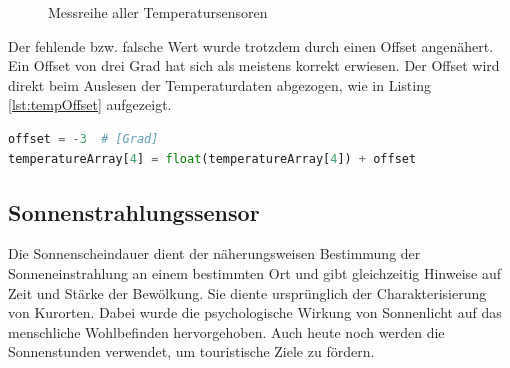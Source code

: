 \begin{figure}[htb!]
	\centering
	\caption{Messreihe aller Temperatursensoren}
	\label{img:tempSensoren}
\end{figure}

\noindent
Der fehlende bzw. falsche Wert wurde trotzdem durch einen Offset angenähert. Ein Offset von drei Grad hat sich als meistens korrekt erwiesen. Der Offset wird direkt beim Auslesen der Temperaturdaten abgezogen, wie in Listing \ref{lst:tempOffset} aufgezeigt.

\vspace{3mm}
\begin{lstlisting}[label=lst:tempOffset,caption=Offset des defekten Temperatursensors, language=Python, style=py]
offset = -3  # [Grad]
temperatureArray[4] = float(temperatureArray[4]) + offset
\end{lstlisting}


\subsection{Sonnenstrahlungssensor}
Die Sonnenscheindauer dient der näherungsweisen Bestimmung der Sonneneinstrahlung an einem bestimmten Ort und gibt gleichzeitig Hinweise auf Zeit und Stärke der Bewölkung. Sie diente ursprünglich der Charakterisierung von Kurorten. Dabei wurde die psychologische Wirkung von Sonnenlicht auf das menschliche Wohlbefinden hervorgehoben. Auch heute noch werden die Sonnenstunden verwendet, um touristische Ziele zu fördern.

